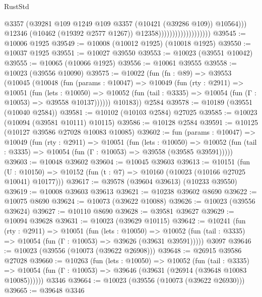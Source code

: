 \begin{lexlean}{RustStd}
\begin{coremodule}
                                              @3357
                                              (@39281
                                                @109
                                                @1249
                                                @109
                                                @3357
                                                (@10421 (@39286 @109))
                                                @10564)))
                                          @12346
                                          (@10462 (@19392 @2577 @1267))
                                          @12358)))))))))))))))))))
@39545 := @10006 @1925
@39549 := @10008 (@10012 @1925) (@10018 @1925)
@39550 := @10037 @1925
@39551 := @10027 @39550
@39553 := @10023 (@39551 @10042)
@39555 := @10065 (@10066 @1925)
@39556 := @10061 @39555
@39558 := @10023 (@39556 @10090)
@39575 := @10022
    (fun (fn : @89) =>
    @39553
      (@10045
        (@10048
          (fun (params : @10047) =>
          @10049
            (fun (rty : @2911) =>
            @10051
              (fun (lets : @10050) =>
              @10052 (fun (tail : @3335) => @10054 (fun (Γ : @10053) => @39558 @10137))))))
        @10183))
    @2584
@39578 := @10189 (@39551 (@10040 @2584))
@39581 := @10102 (@10103 @2584) @27025
@39585 := @10023 (@10094 (@39581 @10111) @10115)
@39586 := @10128 @2584
@39591 := @10125 (@10127 @39586 @27028 @10083 @10085)
@39602 := fun (params : @10047) =>
  @10049
    (fun (rty : @2911) =>
    @10051
      (fun (lets : @10050) =>
      @10052 (fun (tail : @3335) => @10054 (fun (Γ : @10053) => @39558 (@39585 @39591)))))
@39603 := @10048 @39602
@39604 := @10045 @39603
@39613 := @10151
    (fun (U : @10150) => @10152 (fun (t : @7) => @10160 (@10023 (@10166 @27025 @10041) @10177)))
@39617 := @39578 (@39604 @39613) (@10233 @39550)
@39619 := @10008 @39603 @39613
@39621 := @10238 @39602 @8690
@39622 := @10075 @8690
@39624 := @10073 (@39622 @10088)
@39626 := @10023 (@39556 @39624)
@39627 := @10110 @8690
@39628 := @39581 @39627
@39629 := @10094 @39628
@39631 := @10023 (@39629 @10115)
@39642 := @10241
    (fun (rty : @2911) =>
    @10051
      (fun (lets : @10050) =>
      @10052 (fun (tail : @3335) => @10054 (fun (Γ : @10053) => @39626 (@39631 @39591)))))
    @3097
@39646 := @10023 (@39556 (@10073 (@39622 @26908)))
@39648 := @26915 @39586 @27028
@39660 := @10263
    (fun (lets : @10050) =>
    @10052
      (fun (tail : @3335) =>
      @10054 (fun (Γ : @10053) => @39646 (@39631 (@26914 (@39648 @10083 @10085))))))
    @3346
@39664 := @10023 (@39556 (@10073 (@39622 @26930)))
@39665 := @39648 @3346

\end{coremodule}
\end{lexlean}
